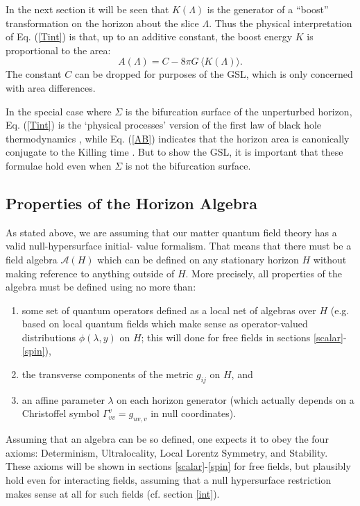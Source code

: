 \documentclass{article}
\begin{document}
In the next section it will be seen that $K(\Lambda)$ is the generator of a ``boost'' transformation on the horizon about the slice $\Lambda$.  Thus the physical interpretation of Eq. (\ref{Tint}) is that, up to an additive constant, the boost energy $K$ is proportional to the area:
\begin{equation}\label{AB}
A(\Lambda) = C - 8\pi G\, \langle K(\Lambda) \rangle.
\end{equation}
The constant $C$ can be dropped for purposes of the GSL, which is only concerned with area differences.

In the special case where $\Sigma$ is the bifurcation surface of the unperturbed horizon, Eq. (\ref{Tint}) is the `physical processes' version of the first law of black hole thermodynamics \cite{GW01}, while Eq. (\ref{AB}) indicates that the horizon area is canonically conjugate to the Killing time \cite{CT93}.  But to show the GSL, it is important that these formulae hold even when $\Sigma$ is not the bifurcation surface.

\subsection{Properties of the Horizon Algebra}\label{sym}

As stated above, we are assuming that our matter quantum field theory has a valid null-hypersurface initial- value formalism.  That means that there must be a field algebra $\mathcal{A}(H)$ which can be defined on any stationary horizon $H$ without making reference to anything outside of $H$.  More precisely, all properties of the algebra must be defined using no more than:
\begin{enumerate}
\item some set of quantum operators defined as a local net of algebras over $H$ (e.g. based on local quantum fields which make sense as operator-valued distributions $\phi(\lambda, y)$ on $H$; this will done for free fields in  sections \ref{scalar}-\ref{spin}),
\item the transverse components of the metric $g_{ij}$ on $H$, and
\item an affine parameter $\lambda$ on each horizon generator (which actually depends on a Christoffel symbol $\Gamma^v_{vv} = g_{uv,v}$ in null coordinates).
\end{enumerate}
Assuming that an algebra can be so defined, one expects it to obey the four axioms: Determinism, Ultralocality, Local Lorentz Symmetry, and Stability.  These axioms will be shown in sections \ref{scalar}-\ref{spin} for free fields, but plausibly hold even for interacting fields, assuming that a null hypersurface restriction makes sense at all for such fields (cf. section \ref{int}).
\end{document}
